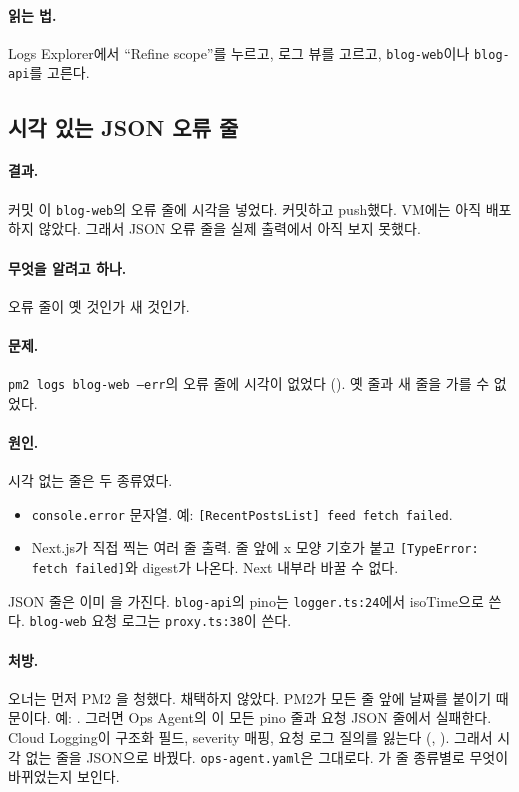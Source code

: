 \paragraph{읽는 법.}
Logs Explorer에서 ``Refine scope''를 누르고, 로그 뷰를 고르고, \texttt{blog-web}이나 \texttt{blog-api}를 고른다.

\subsection{시각 있는 JSON 오류 줄}\label{sec:06-errorjson}

\paragraph{결과.}
커밋 이 \texttt{blog-web}의 오류 줄에 시각을 넣었다.
커밋하고 push했다.
VM에는 아직 배포하지 않았다.
그래서 JSON 오류 줄을 실제 출력에서 아직 보지 못했다.

\paragraph{무엇을 알려고 하나.}
오류 줄이 옛 것인가 새 것인가.

\paragraph{문제.}
\texttt{pm2 logs blog-web --err}의 오류 줄에 시각이 없었다 ().
옛 줄과 새 줄을 가를 수 없었다.

\paragraph{원인.}
시각 없는 줄은 두 종류였다.
\begin{itemize}[nosep]
  \item \texttt{console.error} 문자열. 예: \texttt{[RecentPostsList] feed fetch failed}.
  \item Next.js가 직접 찍는 여러 줄 출력. 줄 앞에 x 모양 기호가 붙고 \texttt{[TypeError: fetch failed]}와 digest가 나온다. Next 내부라 바꿀 수 없다.
\end{itemize}
JSON 줄은 이미 을 가진다.
\texttt{blog-api}의 pino는 \texttt{logger.ts:24}에서 isoTime으로 쓴다.
\texttt{blog-web} 요청 로그는 \texttt{proxy.ts:38}이 쓴다.

\paragraph{처방.}
오너는 먼저 PM2 을 청했다.
채택하지 않았다.
PM2가 모든 줄 앞에 날짜를 붙이기 때문이다. 예: .
그러면 Ops Agent의 이 모든 pino 줄과 요청 JSON 줄에서 실패한다.
Cloud Logging이 구조화 필드, severity 매핑, 요청 로그 질의를 잃는다 (, ).
그래서 시각 없는 줄을 JSON으로 바꿨다.
\texttt{ops-agent.yaml}은 그대로다.
가 줄 종류별로 무엇이 바뀌었는지 보인다.

